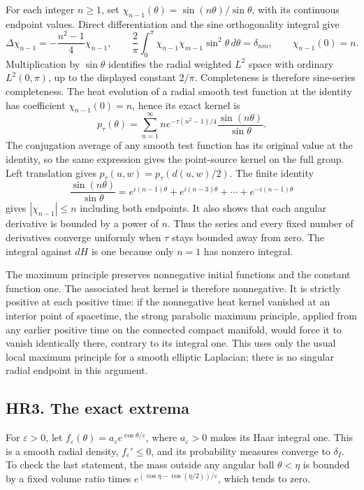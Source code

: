 \documentclass[11pt]{article}
\begin{document}
For each integer \(n\ge1\), set
\(\chi_{n-1}(\theta)=\sin(n\theta)/\sin\theta\), with its continuous
endpoint values. Direct differentiation and the sine orthogonality
integral give
\[
 \Delta\chi_{n-1}=-\frac{n^2-1}{4}\chi_{n-1},\qquad
 \frac2\pi\int_0^\pi\chi_{n-1}\chi_{m-1}\sin^2\theta\,d\theta
 =\delta_{nm},\qquad \chi_{n-1}(0)=n.                       \tag{HR3}
\]
Multiplication by \(\sin\theta\) identifies the radial weighted
\(L^2\) space with ordinary \(L^2(0,\pi)\), up to the displayed
constant \(2/\pi\). Completeness is therefore sine-series completeness.
The heat evolution of a radial smooth test function at the identity
has coefficient \(\chi_{n-1}(0)=n\), hence its exact kernel is
\[
 p_\tau(\theta)=\sum_{n=1}^{\infty}
   n e^{-\tau(n^2-1)/4}\frac{\sin(n\theta)}{\sin\theta}.
                                                               \tag{HR4}
\]
The conjugation average of any smooth test function has its original
value at the identity, so the same expression gives the point-source
kernel on the full group. Left translation gives
\(p_\tau(u,w)=p_\tau(d(u,w)/2)\). The finite identity
\[
 \frac{\sin(n\theta)}{\sin\theta}
 =e^{i(n-1)\theta}+e^{i(n-3)\theta}+\cdots+e^{-i(n-1)\theta}
                                                               \tag{HR5}
\]
gives \(|\chi_{n-1}|\le n\) including both endpoints. It also shows
that each angular derivative is bounded by a power of \(n\).
Thus the series and every fixed number of derivatives converge
uniformly when \(\tau\) stays bounded away from zero. The integral
against \(dH\) is one because only \(n=1\) has nonzero integral.

The maximum principle preserves nonnegative initial functions and the
constant function one. The associated heat kernel is therefore
nonnegative. It is strictly positive at each positive time: if the
nonnegative heat kernel vanished at an interior point of spacetime,
the strong parabolic maximum principle, applied from any earlier
positive time on the connected compact manifold, would force it to
vanish identically there, contrary to its integral one. This uses
only the usual local maximum principle for a smooth elliptic
Laplacian; there is no singular radial endpoint in this argument.

\subsection*{HR3. The exact extrema}

For \(\varepsilon>0\), let
\(f_\varepsilon(\theta)=a_\varepsilon e^{\cos\theta/\varepsilon}\),
where \(a_\varepsilon>0\) makes its Haar integral one. This is a
smooth radial density, \(f_\varepsilon'\le0\), and its probability
measures converge to \(\delta_I\). To check the last statement,
the mass outside any angular ball \(\theta<\eta\) is bounded by
a fixed volume ratio times
\(e^{(\cos\eta-\cos(\eta/2))/\varepsilon}\), which tends to zero.
\end{document}
